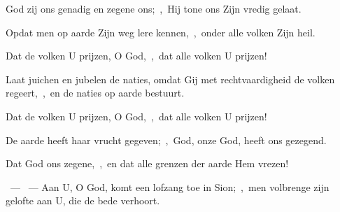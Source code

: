 \documentclass[12pt,twoside,a5paper]{article}
\begin{document}
\begin{halfparskip}
   God zij ons genadig en zegene ons;~\sep\ Hij tone ons Zijn vredig gelaat.

  Opdat men op aarde Zijn weg lere kennen,~\sep\ onder alle volken Zijn heil.

  Dat de volken U prijzen, O God,~\sep\ dat alle volken U prijzen!

  Laat juichen en jubelen de naties, omdat Gij met rechtvaardigheid de volken regeert,~\sep\ en de naties op aarde bestuurt.

  Dat de volken U prijzen, O God,~\sep\ dat alle volken U prijzen!

  De aarde heeft haar vrucht gegeven;~\sep\ God, onze God, heeft ons gezegend.

  Dat God ons zegene,~\sep\ en dat alle grenzen der aarde Hem vrezen!

  ~--- ~--- Aan U, O God, komt een lofzang toe in Sion;~\sep\ men volbrenge zijn gelofte aan U, die de bede verhoort.
\end{halfparskip}

\begin{halfparskip}
\end{halfparskip}
\end{document}
